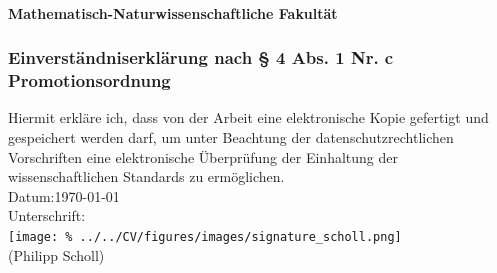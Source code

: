 \documentclass[
  fontsize=11pt,
  paper=a4
]{report}
\begin{document}
\thispagestyle{empty}%
\setlength{\parindent}{0pt}

\paragraph{%
    Mathematisch-Naturwissenschaftliche Fakultät}%
\subsubsection*{%
    Einverständniserklärung nach § 4 Abs. 1 Nr. c Promotionsordnung
}%

    \vspace*{1cm}%
    Hiermit erkläre ich, dass von der Arbeit eine elektronische Kopie gefertigt und gespeichert werden darf, um unter Beachtung der datenschutzrechtlichen Vorschriften eine elektronische Überprüfung der Einhaltung der wissenschaftlichen Standards zu ermöglichen.\\[1cm]%

    Datum:\qquad\today\\[1cm]%

    Unterschrift:\\[.5cm]%
    \texttt{[image: \%
        ../../CV/figures/images/signature\_scholl.png]}\\[-0.5cm]%
    (Philipp Scholl)%
\end{document}
